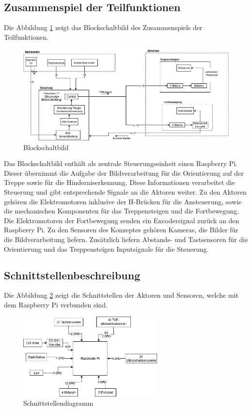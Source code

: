 \newpage
\subsection{Zusammenspiel der Teilfunktionen}
 Die Abbildung \ref{blockschaltbild} zeigt das Blockschaltbild des Zusammenspiels der Teilfunktionen.

\begin{figure}[h]
  \includegraphics[width=\textwidth]{img/Funktionsmuster Treppensteigen/Blockschaltbild_V2.png}
  \centering
  \caption{Blockschaltbild}
  \label{blockschaltbild}
\end{figure}

 Das Blockschaltbild enthält als zentrale Steuerungseinheit einen Raspberry Pi. Dieser übernimmt die Aufgabe der Bildverarbeitung für die Orientierung auf der Treppe sowie für die Hinderniserkennung. Diese Informationen verarbeitet die Steuerung und gibt entsprechende Signale an die Aktoren weiter. Zu den Aktoren gehören die Elektromotoren inklusive der H-Brücken für die Ansteuerung, sowie die mechanischen Komponenten für das Treppensteigen und die Fortbewegung. Die Elektromotoren der Fortbewegung senden ein Encodersignal zurück an den Raspberry Pi. Zu den Sensoren des Konzeptes gehören Kameras, die Bilder für die Bildverarbeitung liefern. Zusätzlich liefern Abstands- und Tastsensoren für die Orientierung und das Treppensteigen Inputsignale für die Steuerung.

\newpage



\subsection{Schnittstellenbeschreibung}
Die Abbildung \ref{schnittstellen} zeigt die Schnittstellen der Aktoren und Sensoren, welche mit dem Raspberry Pi verbunden sind.

\begin{figure}[h]
  \includegraphics[width=0.65\textwidth]{img/Funktionsmuster Treppensteigen/Schnittstellen.png}
  \centering
  \caption{Schnittstellendiagramm}
  \label{schnittstellen}
\end{figure}

